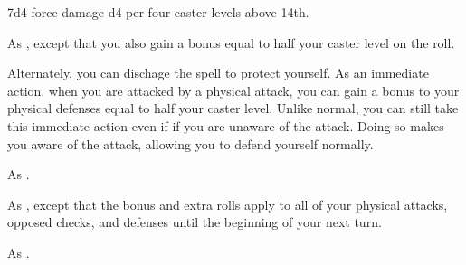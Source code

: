 \begin{spellheader}
\end{spellheader}
\begin{spelleffects}
    \spelleffect 7d4 force damage \add d4 per four caster levels above 14th.
\end{spelleffects}
\begin{spellfooter}

\end{spellfooter}

\begin{spellheader}
\end{spellheader}
\begin{spelleffects}
    \spelleffect As , except that you also gain a bonus equal to half your caster level on the roll.

    Alternately, you can dischage the spell to protect yourself. As an immediate action, when you are attacked by a physical attack, you can gain a bonus to your physical defenses equal to half your caster level. Unlike normal, you can still take this immediate action even if if you are unaware of the attack. Doing so makes you aware of the attack, allowing you to defend yourself normally.
\end{spelleffects}
\begin{spellfooter}
    \spellnotes As .
\end{spellfooter}

\begin{spellheader}
\end{spellheader}
\begin{spelleffects}
    \spelleffect As , except that the bonus and extra rolls apply to all of your physical attacks, opposed checks, and defenses until the beginning of your next turn.
\end{spelleffects}
\begin{spellfooter}
    \spellnotes As .
\end{spellfooter}

